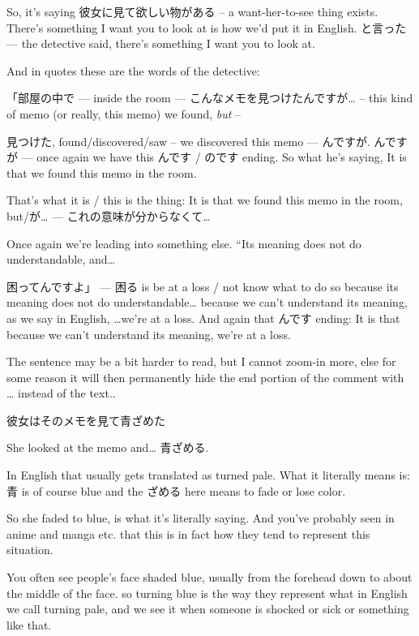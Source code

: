 So, it's saying 彼女に見て欲しい物がある -- a want-her-to-see thing exists. There's something I want you to look at is how we'd put it in English. と言った --- the detective said, there's something I want you to look at.

And in quotes these are the words of the detective:

「部屋の中で --- inside the room --- こんなメモを見つけたんですが\ldots{} -- this kind of memo (or really, this memo) we found, {\em but} --

{}

見つけた, found/discovered/saw -- we discovered this memo --- んですが. んですが --- once again we have this んです / のです ending. So what he's saying, It is that we found this memo in the room.

That's what it is / this is the thing: It is that we found this memo in the room, but/が\ldots{} --- これの意味が分からなくて\ldots{}

{}

Once again we're leading into something else. “Its meaning does not do understandable, and\ldots{}

困ってんですよ」 --- 困る is be at a loss / not know what to do so because its meaning does not do understandable\ldots{} because we can't understand its meaning, as we say in English, \ldots{}we're at a loss. And again that んです ending: It is that because we can't understand its meaning, we're at a loss.

{}

The sentence may be a bit harder to read, but I cannot zoom-in more, else for some reason it will then permanently hide the end portion of the comment with \ldots{} instead of the text..

彼女はそのメモを見て青ざめた

She looked at the memo and\ldots{} 青ざめる.

{}

In English that usually gets translated as turned pale. What it literally means is: 青 is of course blue and the ざめる here means to fade or lose color.

So she faded to blue, is what it's literally saying. And you've probably seen in anime and manga etc. that this is in fact how they tend to represent this situation.

You often see people's face shaded blue, usually from the forehead down to about the middle of the face. so turning blue is the way they represent what in English we call turning pale, and we see it when someone is shocked or sick or something like that.


